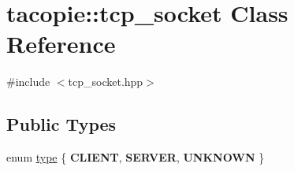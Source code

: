 \hypertarget{classtacopie_1_1tcp__socket}{}\section{tacopie\+:\+:tcp\+\_\+socket Class Reference}
\label{classtacopie_1_1tcp__socket}


{\ttfamily \#include $<$tcp\+\_\+socket.\+hpp$>$}

\subsection*{Public Types}
\begin{DoxyCompactItemize}
\item 
enum \hyperlink{classtacopie_1_1tcp__socket_ad8376e85df96ab9523f5d079ed7172ab}{type} \{ {\bfseries C\+L\+I\+E\+NT}, 
{\bfseries S\+E\+R\+V\+ER}, 
{\bfseries U\+N\+K\+N\+O\+WN}
 \}
\end{DoxyCompactItemize}
